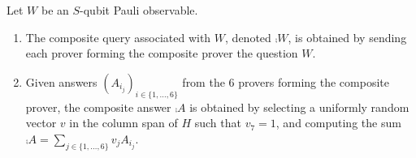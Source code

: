 \begin{definition}\label{def:queries}
Let $W$ be an $S$-qubit Pauli observable.
\begin{enumerate}
\item The composite query associated with $W$, denoted $\comp{W}$, is
  obtained by sending each prover forming the composite prover the question $W$.
\item 
Given answers $(A_{i_j})_{i\in\{1,\ldots,6\}}$ from the $6$ provers
  forming the composite prover, the composite answer $\comp{A}$ is
  obtained by selecting a uniformly random vector $v$ in the column
  span of $H$ such that $v_7=1$, and computing the sum $\comp{A} =
  \sum_{j\in\{1,\ldots,6\}} v_j A_{i_j}$.
\end{enumerate}
\end{definition} 


